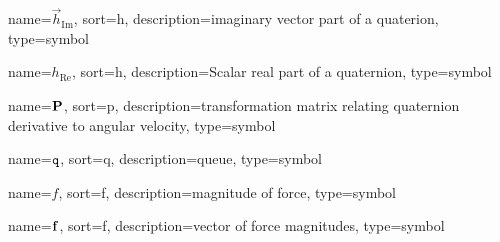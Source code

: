 	{%
		name=\ensuremath{\vec{h}_{\mathrm{Im}}}, %
		sort=h,
		description=imaginary vector part of a quaterion,
		type=symbol
	}
	\newcommand{\quaternionimg}{\gls{sym:quaternionimg}}

	{%
		name=\ensuremath{h_{\mathrm{Re}}}, %
		sort=h,
		description=Scalar real part of a quaternion,
		type=symbol
	}
	\newcommand{\quaternionre}{\gls{sym:quaternionre}}

	{%
		name=\ensuremath{\mat{P}}, %
		sort=p,
		description=transformation matrix relating quaternion derivative to angular velocity,
		type=symbol
	}
	\newcommand{\quaternionToAvelTrans}{\gls{sym:quaternionToAvelTrans}}

	{%
		name=\ensuremath{\code{q}},
		sort=q,
		description=queue,
		type=symbol
	}
	\newcommand{\queue}{\gls{sym:queue}}

	{%
		name=\ensuremath{f},
		sort=f,
		description=magnitude of force,
		type=symbol
	}
	\newcommand{\forcemag}{\gls{sym:forcemag}}

	{%
		name=\ensuremath{\mat{f}},
		sort=f,
		description=vector of force magnitudes,
		type=symbol
	}
	\newcommand{\forcemagvec}{\gls{sym:forcemagvec}}

